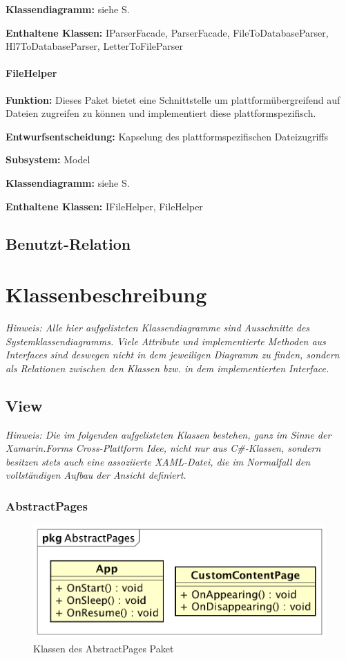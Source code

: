 \documentclass[a4paper]{scrreprt}
\begin{document}
\textbf{Klassendiagramm:} siehe S.

\textbf{Enthaltene Klassen:} IParserFacade, ParserFacade, FileToDatabaseParser, Hl7ToDatabaseParser, LetterToFileParser

\subsubsection{FileHelper}
\textbf{Funktion:} Dieses Paket bietet eine Schnittstelle um plattformübergreifend auf Dateien zugreifen zu können und implementiert diese plattformspezifisch.

\textbf{Entwurfsentscheidung:} Kapselung des plattformspezifischen Dateizugriffs

\textbf{Subsystem:} Model

\textbf{Klassendiagramm:} siehe S.

\textbf{Enthaltene Klassen:} IFileHelper, FileHelper

\section{Benutzt-Relation}

\chapter{Klassenbeschreibung}
\textit{Hinweis: Alle hier aufgelisteten Klassendiagramme sind Ausschnitte des Systemklassendiagramms. Viele Attribute und implementierte Methoden aus Interfaces sind deswegen nicht in dem jeweiligen Diagramm zu finden, sondern als Relationen zwischen den Klassen bzw. in dem implementierten Interface.}
 
\section{View}
\textit{Hinweis: Die im folgenden aufgelisteten Klassen bestehen, ganz im Sinne der Xamarin.Forms Cross-Plattform Idee, nicht nur aus C\#-Klassen, sondern besitzen stets auch eine assoziierte XAML-Datei, die im Normalfall den vollständigen Aufbau der Ansicht definiert.}

\subsection{AbstractPages}
\begin{figure}[H]
\centering
\includegraphics[width=0.75\textheight]{graphics/Klassendiagramme/View/AbstractPages.png}
\caption{Klassen des AbstractPages Paket}
\end{figure}
\end{document}
